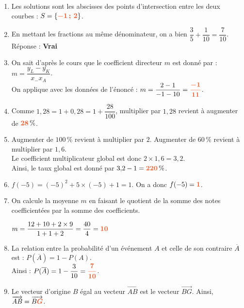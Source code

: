 \documentclass[a4paper,11pt]{article}
\newcounter{seancenum}
\begin{document}
\setcounter{seancenum}{24}
\newpage
\begin{seance}{} %

\begin{enumerate}
\item Les solutions sont les abscisses des points d'intersection entre les deux courbes :
   $S=\{{\color[HTML]{f15929}\boldsymbol{-1\,;\,2}}\}$. 
	\item En mettant les fractions au même dénominateur, on a bien $\dfrac{3}{5}+\dfrac{1}{10}=\dfrac{7}{10}$.
    Réponse : {\bfseries \color[HTML]{f15929}Vrai}
	\item On sait d'après le cours que le coefficient directeur $m$ est donné par : $m=\dfrac{y_L-y_K}{x_-x_A}$.\\On applique avec les données de l'énoncé :
        $m=\dfrac{2-1}{-1-10}=
        {\color[HTML]{f15929}\boldsymbol{\dfrac{-1}{11}}}$.
	\item Comme $1{,}28=1+0{,}28=1+\dfrac{28}{100}$, multiplier par $1{,}28$ revient à augmenter de ${\color[HTML]{f15929}\boldsymbol{28}}\,\%$. 
	\item Augmenter de $100\,\%$ revient à multiplier par $2$. Augmenter de $60\,\%$ revient à multiplier par $1{,}6$.\\
        Le coefficient multiplicateur global est donc $2\times 1{,}6=3{,}2$.\\
        Ainsi, le taux global est donné par $3{,}2-1={\color[HTML]{f15929}\boldsymbol{220}}\,\%$.
	\item $f(-5)=\left(-5 \right)^2 +5 \times \left(-5\right) +1 = 1$. 
    On a donc $f(-5)={\color[HTML]{f15929}\boldsymbol{1}}$.
	\item On calcule la moyenne $m$ en faisant le quotient de la somme des notes coefficientées par la somme des coefficients. \\
	\medskip
	
        $m=\dfrac{12+10+2\times 9}{1+1+2}=\dfrac{40}{4}={\color[HTML]{f15929}\boldsymbol{10}}$
	\item La relation entre la probabilité d'un événement $A$ et celle de son contraire $\overline{A}$ est :  $P(\overline{A})=1-P(A)$.\\
          Ainsi : $P(\overline{A})=1-\dfrac{3}{10}={\color[HTML]{f15929}\boldsymbol{\dfrac{7}{10}}}$.
	\item Le vecteur d'origine $B$ égal au  vecteur $\overrightarrow{AB}$ est le vecteur $\overrightarrow{BG}$. 
    Ainsi, $\overrightarrow{AB}=\overrightarrow{B{\color[HTML]{f15929}\boldsymbol{G}}}$.
	

\end{enumerate}
\end{seance}
\end{document}
